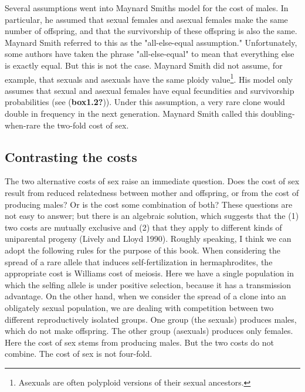 \documentclass[
  11pt,
  letterpaper,
]{scrbook}
\begin{document}
Several assumptions went into Maynard Smith\textquotesingle s model for
the cost of males. In particular, he assumed that sexual females and
asexual females make the same number of offspring, and that the
survivorship of these offspring is also the same. Maynard Smith referred
to this as the "all-else-equal assumption." Unfortunately, some authors
have taken the phrase "all-else-equal" to mean that everything else is
exactly equal. But this is not the case. Maynard Smith did not assume,
for example, that sexuals and asexuals have the same ploidy
value\footnote{Asexuals are often polyploid versions of their sexual
  ancestors.}. His model only assumes that sexual and asexual females
have equal fecundities and survivorship probabilities (see
(\textbf{box1.2?})). Under this assumption, a very rare clone would
double in frequency in the next generation. Maynard Smith called this
doubling-when-rare the two-fold cost of sex.

\hypertarget{contrasting-the-costs}{%
\subsection{Contrasting the costs}\label{contrasting-the-costs}}

The two alternative costs of sex raise an immediate question. Does the
cost of sex result from reduced relatedness between mother and
offspring, or from the cost of producing males? Or is the cost some
combination of both? These questions are not easy to answer; but there
is an algebraic solution, which suggests that the (1) two costs are
mutually exclusive and (2) that they apply to different kinds of
uniparental progeny (Lively and Lloyd 1990). Roughly speaking, I think
we can adopt the following rules for the purpose of this book. When
considering the spread of a rare allele that induces self-fertilization
in hermaphrodites, the appropriate cost is Williams\textquotesingle{}
cost of meiosis. Here we have a single population in which the selfing
allele is under positive selection, because it has a transmission
advantage. On the other hand, when we consider the spread of a clone
into an obligately sexual population, we are dealing with competition
between two different reproductively isolated groups. One group (the
sexuals) produces males, which do not make offspring. The other group
(asexuals) produces only females. Here the cost of sex stems from
producing males. But the two costs do not combine. The cost of sex is
not four-fold.
\end{document}

